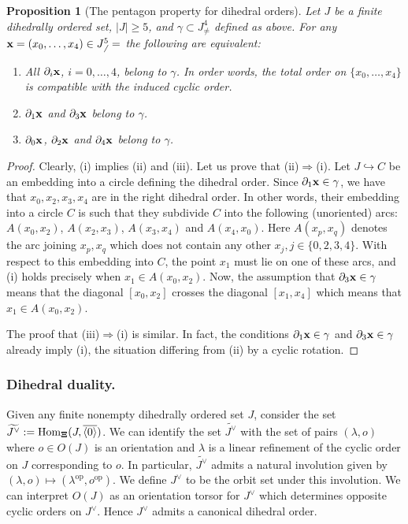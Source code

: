 \documentclass[english,11pt,leqno]{article}
\def\Hom{\operatorname{Hom}}
\def\op{{\operatorname{op}}}
\def\Hom{\operatorname{Hom}}
\newtheorem{prop}[thm]{Proposition}
\theoremstyle{definition}
\theoremstyle{remark}
\numberwithin{equation}{section}
\begin{document}
\begin{prop}[The pentagon property for dihedral orders]
Let $J$ be a finite dihedrally ordered set, $|J|\geq 5$, and $\gamma\subset J^4_\neq$
defined as above. For any ${\bf x}=(x_0, \dots, x_4) \in J^5_\neq$ the following are equivalent:
\begin{enumerate}
\item[(i)] 
All $\partial_i {\bf x}$, $i=0, \dots, 4$, belong to $\gamma$.
In order words, the 
total order on $\{x_0, \dots, x_4\}$ is compatible with the induced cyclic order. 

\item[(ii)] $\partial_1{\bf x}$ and $\partial_3 {\bf x}$ belong to $\gamma$.

\item[(iii)] $\partial_0{\bf x}$, $\partial_2{\bf x}$ and $\partial_4 {\bf x}$ belong to $\gamma$. 
\end{enumerate}
\end{prop}
 
\begin{proof} Clearly, (i) implies (ii) and (iii). Let us prove that (ii)$\Rightarrow$(i).  Let
	$J\hookrightarrow C$ be an embedding into a circle defining the dihedral order.   Since
	$\partial_1{\bf x}\in\gamma$, we have that $x_0, x_2, x_3, x_4$ are in the right dihedral
	order.  In other words,  their embedding into a circle $C$ is such that they subdivide $C$
	into the following  (unoriented)  arcs: $A(x_0, x_2)$, $A(x_2, x_3)$, $A(x_3, x_4)$ and
	$A(x_4, x_0)$.  Here $A(x_p, x_q)$ denotes the arc joining $x_p, x_q$ which does not contain
	any other $x_j, j\in \{0,2,3,4\}$.  With respect to this embedding into $C$, the point $x_1$
	must lie on one of these arcs, and (i) holds precisely  when $x_1\in A(x_0, x_2)$. Now, the
	assumption that $\partial_3{\bf x}\in\gamma$ means that the diagonal $[x_0, x_2]$ crosses
	the diagonal $[x_1, x_4]$ which means that $x_1\in A(x_0, x_2)$. 
 
	 The proof that (iii)$\Rightarrow$(i) is similar. In fact, the conditions $\partial_1{\bf
	 x}\in\gamma$ and $\partial_3{\bf x}\in\gamma$ already imply (i), the situation differing from (ii)
	 by a cyclic rotation. 
\end{proof}


\subsubsection{Dihedral duality.}
 
Given any finite nonempty dihedrally ordered set $J$, consider the set $\widetilde{J^{\vee}} :=
\Hom_{{\bf \Xi}}(J, \overline {\langle 0\rangle})$. We can identify the set $\widetilde{J^{\vee}}$ with the set of pairs
$(\lambda, o)$ where $o \in O(J)$ is an orientation and $\lambda$ is a linear refinement of the
cyclic order on $J$ corresponding to $o$. In particular, $\widetilde{J^{\vee}}$ admits a natural
involution given by $(\lambda,o) \mapsto (\lambda^{\op}, o^{\op})$. We define $J^{\vee}$ to be the
orbit set under this involution. We can interpret $O(J)$ as an orientation torsor for $J^{\vee}$
which determines opposite cyclic orders on $J^{\vee}$. Hence $J^{\vee}$ admits a canonical dihedral
order. 
\end{document}
